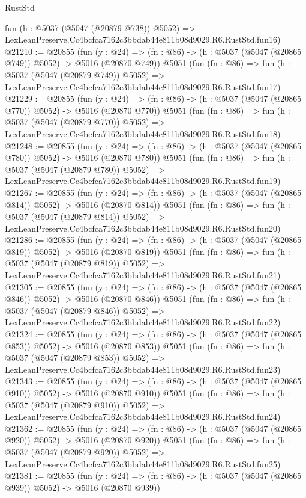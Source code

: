 \begin{lexlean}{RustStd}
\begin{coremodule}
    fun (h : @5037 (@5047 (@20879 @738)) @5052) =>
    LexLeanPreserve.Cc4bcfca7162c3bbdab44e811b08d9029.R6.RustStd.fun16)
@21210 := @20855
    (fun (y : @24) => (fn : @86) -> (h : @5037 (@5047 (@20865 @749)) @5052) -> @5016 (@20870 @749))
    @5051
    (fun (fn : @86) =>
    fun (h : @5037 (@5047 (@20879 @749)) @5052) =>
    LexLeanPreserve.Cc4bcfca7162c3bbdab44e811b08d9029.R6.RustStd.fun17)
@21229 := @20855
    (fun (y : @24) => (fn : @86) -> (h : @5037 (@5047 (@20865 @770)) @5052) -> @5016 (@20870 @770))
    @5051
    (fun (fn : @86) =>
    fun (h : @5037 (@5047 (@20879 @770)) @5052) =>
    LexLeanPreserve.Cc4bcfca7162c3bbdab44e811b08d9029.R6.RustStd.fun18)
@21248 := @20855
    (fun (y : @24) => (fn : @86) -> (h : @5037 (@5047 (@20865 @780)) @5052) -> @5016 (@20870 @780))
    @5051
    (fun (fn : @86) =>
    fun (h : @5037 (@5047 (@20879 @780)) @5052) =>
    LexLeanPreserve.Cc4bcfca7162c3bbdab44e811b08d9029.R6.RustStd.fun19)
@21267 := @20855
    (fun (y : @24) => (fn : @86) -> (h : @5037 (@5047 (@20865 @814)) @5052) -> @5016 (@20870 @814))
    @5051
    (fun (fn : @86) =>
    fun (h : @5037 (@5047 (@20879 @814)) @5052) =>
    LexLeanPreserve.Cc4bcfca7162c3bbdab44e811b08d9029.R6.RustStd.fun20)
@21286 := @20855
    (fun (y : @24) => (fn : @86) -> (h : @5037 (@5047 (@20865 @819)) @5052) -> @5016 (@20870 @819))
    @5051
    (fun (fn : @86) =>
    fun (h : @5037 (@5047 (@20879 @819)) @5052) =>
    LexLeanPreserve.Cc4bcfca7162c3bbdab44e811b08d9029.R6.RustStd.fun21)
@21305 := @20855
    (fun (y : @24) => (fn : @86) -> (h : @5037 (@5047 (@20865 @846)) @5052) -> @5016 (@20870 @846))
    @5051
    (fun (fn : @86) =>
    fun (h : @5037 (@5047 (@20879 @846)) @5052) =>
    LexLeanPreserve.Cc4bcfca7162c3bbdab44e811b08d9029.R6.RustStd.fun22)
@21324 := @20855
    (fun (y : @24) => (fn : @86) -> (h : @5037 (@5047 (@20865 @853)) @5052) -> @5016 (@20870 @853))
    @5051
    (fun (fn : @86) =>
    fun (h : @5037 (@5047 (@20879 @853)) @5052) =>
    LexLeanPreserve.Cc4bcfca7162c3bbdab44e811b08d9029.R6.RustStd.fun23)
@21343 := @20855
    (fun (y : @24) => (fn : @86) -> (h : @5037 (@5047 (@20865 @910)) @5052) -> @5016 (@20870 @910))
    @5051
    (fun (fn : @86) =>
    fun (h : @5037 (@5047 (@20879 @910)) @5052) =>
    LexLeanPreserve.Cc4bcfca7162c3bbdab44e811b08d9029.R6.RustStd.fun24)
@21362 := @20855
    (fun (y : @24) => (fn : @86) -> (h : @5037 (@5047 (@20865 @920)) @5052) -> @5016 (@20870 @920))
    @5051
    (fun (fn : @86) =>
    fun (h : @5037 (@5047 (@20879 @920)) @5052) =>
    LexLeanPreserve.Cc4bcfca7162c3bbdab44e811b08d9029.R6.RustStd.fun25)
@21381 := @20855
    (fun (y : @24) => (fn : @86) -> (h : @5037 (@5047 (@20865 @939)) @5052) -> @5016 (@20870 @939))

\end{coremodule}
\end{lexlean}
